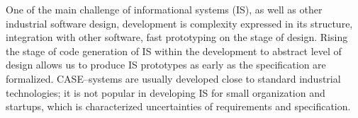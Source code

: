 \documentclass[conference]{IEEEtran}
\begin{document}




One of the main challenge of informational systems (IS), as well as other industrial software design, development is complexity expressed in its structure, integration with other software, fast prototyping on the stage of design.  Rising the stage of code generation of IS within the development to abstract level of design allows us to produce IS prototypes as early as the specification are formalized.  CASE--systems are usually developed close to standard industrial  technologies; it is not popular in developing IS for small organization and startups, which is characterized uncertainties of requirements and specification.
\end{document}
